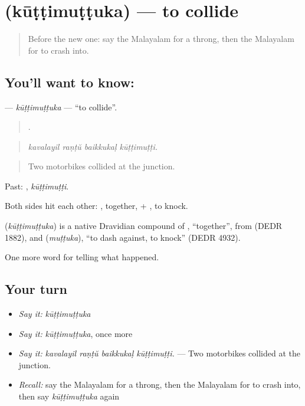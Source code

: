 \section[\texorpdfstring{\ml{കൂട്ടിമുട്ടുക} (kūṭṭimuṭṭuka)}{കൂട്ടിമുട്ടുക (kūṭṭimuṭṭuka)}]{ (kūṭṭimuṭṭuka) — to collide}

\label{lesson:ML-C379-kuttimuttuka}



\begin{quote}
Before the new one: say the Malayalam for a throng, then the Malayalam for to crash into.
\end{quote}

\subsection*{You'll want to know: }
\textbf{} — \emph{kūṭṭimuṭṭuka} — \textquotedblleft{}to collide\textquotedblright{}.

\begin{quote}
   .
\end{quote}

\begin{quote}
\emph{kavalayil raṇṭŭ baikkukaḷ kūṭṭimuṭṭi.}
\end{quote}

\begin{quote}
Two motorbikes collided at the junction.
\end{quote}

Past: , \emph{kūṭṭimuṭṭi}.

Both sides hit each other: , together, + , to knock.

\begin{cousinweb}
\textbf{} (\emph{kūṭṭimuṭṭuka}) is a native Dravidian compound of , \textquotedblleft{}together\textquotedblright{}, from  (DEDR 1882), and  (\emph{muṭṭuka}), \textquotedblleft{}to dash against, to knock\textquotedblright{} (DEDR 4932).
\end{cousinweb}

\begin{grammarlens}[title={What you've built}]
One more word for telling what happened.
\end{grammarlens}

\subsection*{Your turn}
\begin{itemize}
\raggedright
  \item \emph{Say it:} \emph{kūṭṭimuṭṭuka}
  \item \emph{Say it:} \emph{kūṭṭimuṭṭuka}, once more
  \item \emph{Say it:} \emph{kavalayil raṇṭŭ baikkukaḷ kūṭṭimuṭṭi.} — Two motorbikes collided at the junction.
  \item \emph{Recall:} say the Malayalam for a throng, then the Malayalam for to crash into, then say \emph{kūṭṭimuṭṭuka} again
\end{itemize}

